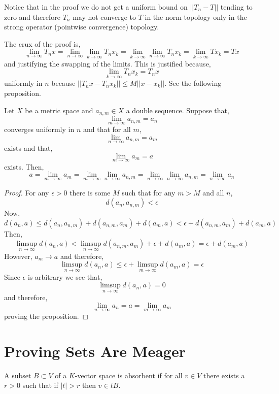 \documentclass[12pt]{article}
\begin{document}
\begin{rmk}
Notice that in the proof we do not get a uniform bound on $|| T_n - T ||$ tending to zero and therefore $T_n$ may not converge to $T$ in the norm topology only in the strong operator (pointwise convergence) topology.
\end{rmk}

\begin{rmk}
The crux of the proof is,
\[ \lim_{n \to \infty} T_n x = \lim_{n \to \infty} \lim_{k \to \infty} T_n x_k = \lim_{k \to \infty} \lim_{n \to \infty} T_n x_k = \lim_{k \to \infty} T x_k = T x \]
and justifying the swapping of the limits. This is justified because,
\[ \lim_{k \to \infty} T_n x_k = T_n x \]
uniformly in $n$ because $|| T_n x - T_n x_k || \le M || x - x_k ||$. See the following proposition.
\end{rmk}

\begin{prop}
Let $X$ be a metric space and $a_{n,m} \in X$ a double sequence. Suppose that,
\[ \lim_{m \to \infty} a_{n,m} = a_n \]
converges uniformly in $n$ and that for all $m$,
\[ \lim_{n \to \infty} a_{n,m} = a_m \]
exists and that,
\[ \lim_{m \to \infty} a_m = a \]
exists. Then,
\[ a = \lim_{m \to \infty} a_m = \lim_{m \to \infty} \lim_{n \to \infty} a_{n,m} = \lim_{n \to \infty} \lim_{n \to \infty} a_{n,m} = \lim_{n \to \infty} a_n \]
\end{prop}

\begin{proof}
For any $\epsilon > 0$ there is some $M$ such that for any $m > M$ and all $n$,
\[ d(a_{n}, a_{n,m})  < \epsilon \]
Now,
\[ d(a_n, a) \le d(a_n, a_{n,m}) + d(a_{n,m}, a_m) + d(a_m, a) < \epsilon + d(a_{n,m}, a_m) + d(a_m, a) \]
Then, 
\[ \limsup_{n \to \infty} d(a_n, a) < \limsup_{n \to \infty} d(a_{n,m}, a_m) + \epsilon + d(a_m, a) = \epsilon + d(a_m, a) \]
However, $a_m \to a$ and therefore,
\[ \limsup_{n \to \infty} d(a_n, a) \le \epsilon + \limsup_{m \to \infty} d(a_m, a) = \epsilon \]
Since $\epsilon$ is arbitrary we see that,
\[ \limsup_{n \to \infty} d(a_n, a) = 0 \]
and therefore,
\[ \lim_{n \to \infty} a_n = a = \lim_{m \to \infty} a_m \]
proving the proposition.
\end{proof}

\section{Proving Sets Are Meager}

\begin{defn}
A subset $B \subset V$ of a $K$-vector space is absorbent if for all $v \in V$ there exists a $r > 0$ such that if $|t| > r$ then $v \in t B$.
\end{defn}
\end{document}
